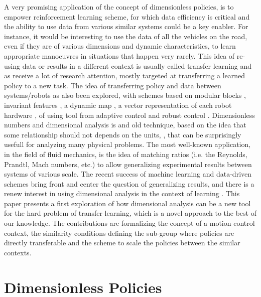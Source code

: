 A very promising application of the concept of dimensionless policies, is to empower reinforcement learning scheme, for which data efficiency is critical and the ability to use data from various similar systems could be a key enabler. For instance, it would be interesting to use the data of all the vehicles on the road, even if they are of various dimensions and dynamic characteristics, to learn appropriate manoeuvres in situations that happen very rarely. This idea of re-using data or results in a different context is usually called transfer learning \cite{taylor_transfer_2009} and as receive a lot of research attention, mostly targeted at transferring a learned policy to a new task. The idea of transferring policy and data between systems/robots as also been explored, with schemes based on modular blocks \cite{devin_learning_2017}, invariant features \cite{gupta_learning_2017}, a dynamic map \cite{helwa_multi-robot_2017}, a vector representation of each robot hardware \cite{chen_hardware_2018}, of using tool from adaptive control \cite{pereida_data-efficient_2018} and robust control \cite{sorocky_experience_2020}. Dimensionless numbers and dimensional analysis is and old technique, based on the idea that some relationship should not depends on the units, \cite{bertrand_sur_1878} \cite{rayleigh_viii_1892} \cite{buckingham_physically_1914}, that can be surprisingly usefull for analyzing many physical problems. The most well-known application, in the field of fluid mechanics, is the idea of matching ratios (i.e. the Reynolds, Prandtl, Mach numbers, etc.) to allow generalizing experimental results between systems of various scale. The recent success of machine learning and data-driven schemes bring front and center the question of generalizing results, and there is a renew interest in using dimensional analysis in the context of learning \cite{bakarji_dimensionally_2022} \cite{fukami_robust_2021} \cite{xie_data-driven_2022}. This paper presents a first exploration of how dimensional analysis can be a new tool for the hard problem of transfer learning, which is a novel approach to the best of our knowledge. The contributions are formalizing the concept of a motion control context, the similarity conditions defining the sub-group where policies are directly transferable and the scheme to scale the policies between the similar contexts.

\section{Dimensionless Policies}
\label{sec:dimenanalysis}


